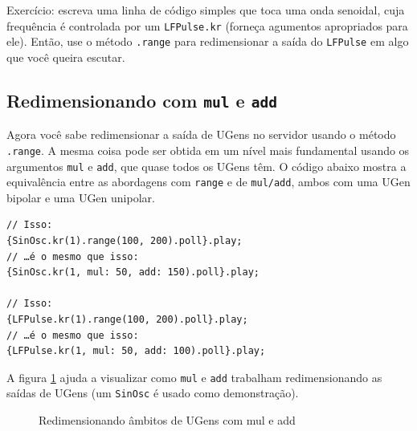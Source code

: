 Exercício: escreva uma linha de código simples que toca uma onda senoidal, cuja frequência é controlada por um \texttt{LFPulse.kr} (forneça agumentos apropriados para ele). Então, use o método \texttt{.range} para redimensionar a saída do \texttt{LFPulse} em algo que você queira escutar. 

\subsection{Redimensionando com \texttt{mul} e \texttt{add}}

Agora você sabe redimensionar a saída de UGens no servidor usando o método \texttt{.range}. A mesma coisa pode ser obtida em um nível mais fundamental usando os argumentos \texttt{mul} e \texttt{add}, que quase todos os UGens têm. O código abaixo mostra a equivalência entre as abordagens com \texttt{range} e de \texttt{mul/add}, ambos com uma UGen bipolar e uma UGen unipolar.

\begin{lstlisting}[style=SuperCollider-IDE, basicstyle=\scttfamily\footnotesize]
// Isso:
{SinOsc.kr(1).range(100, 200).poll}.play;
// …é o mesmo que isso:
{SinOsc.kr(1, mul: 50, add: 150).poll}.play;

// Isso:
{LFPulse.kr(1).range(100, 200).poll}.play;
// …é o mesmo que isso:
{LFPulse.kr(1, mul: 50, add: 100).poll}.play;
\end{lstlisting}

A figura \ref{fig:mul-add-scale} ajuda a visualizar como \texttt{mul} e \texttt{add} trabalham redimensionando as saídas de UGens (um \texttt{SinOsc} é usado como demonstração).

\begin{figure}[h!]
\centerline{}
\caption{Redimensionando âmbitos de UGens com mul e add}
\label{fig:mul-add-scale}
\end{figure}

